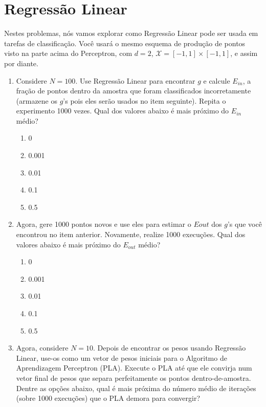 \section{Regressão Linear}

Nestes problemas, nós vamos explorar como Regressão Linear pode ser usada em tarefas de classificação.
Você usará o mesmo esquema de produção de pontos visto na parte acima do Perceptron, com $d = 2$,
$\mathcal{X} = [-1, 1] \times [-1, 1]$, e assim por diante.

\begin{enumerate}
    \item Considere $N = 100$. Use Regressão Linear para encontrar $g$ e calcule $E_{in}$, a fração de pontos dentro da amostra que foram classificados incorretamente (armazene os $g$'s pois eles serão usados no item seguinte). Repita o experimento 1000 vezes. Qual dos valores abaixo é mais próximo do $E_{in}$ médio?
    
    \begin{enumerate}
        \item 0
        \item 0.001
        \item 0.01
        \item 0.1
        \item 0.5
    \end{enumerate}

    \item Agora, gere 1000 pontos novos e use eles para estimar o $Eout$ dos $g$'s que você encontrou no item anterior. Novamente, realize 1000 execuções. Qual dos valores abaixo é mais próximo do $E_{out}$ médio?
    
    \begin{enumerate}
        \item 0
        \item 0.001
        \item 0.01
        \item 0.1
        \item 0.5
    \end{enumerate}

    \item Agora, considere $N = 10$. Depois de encontrar os pesos usando Regressão Linear, use-os como um vetor de pesos iniciais para o Algoritmo de Aprendizagem Perceptron (PLA). Execute o PLA até que ele convirja num vetor final de pesos que separa perfeitamente os pontos dentro-de-amostra. Dentre as opções abaixo, qual é mais próxima do número médio de iterações (sobre 1000 execuções) que o PLA demora para convergir?
    

\end{enumerate}
